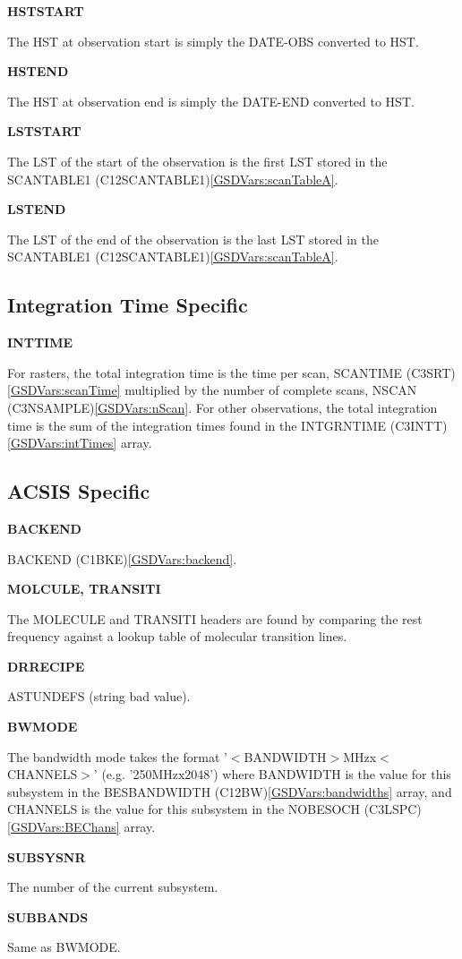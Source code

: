 \documentclass[twoside,11pt]{article}
\newcommand{\xlabel}[1]{}
\renewcommand{\_}{\texttt{\symbol{95}}}
\newcommand{\backend}{BACKEND (C1BKE)}
\newcommand{\nScan}{NSCAN (C3NSAMPLE)}
\newcommand{\scanTime}{SCAN\_TIME (C3SRT)}
\newcommand{\scanTableA}{SCAN\_TABLE1 (C12SCAN\_TABLE\_1)}
\newcommand{\BEChans}{NO\_BES\_O\_CH (C3LSPC)}
\newcommand{\bandwidths}{BES\_BANDWIDTH (C12BW)}
\newcommand{\intTimes}{INTGRN\_TIME (C3INTT)}
\renewcommand{\backend}{BACKEND (C1BKE)\ref{GSDVars:backend}}
\renewcommand{\nScan}{NSCAN (C3NSAMPLE)\ref{GSDVars:nScan}}
\renewcommand{\scanTime}{SCAN\_TIME (C3SRT)\ref{GSDVars:scanTime}}
\renewcommand{\scanTableA}{SCAN\_TABLE1 (C12SCAN\_TABLE\_1)\ref{GSDVars:scanTableA}}
\renewcommand{\BEChans}{NO\_BES\_O\_CH (C3LSPC)\ref{GSDVars:BEChans}}
\renewcommand{\bandwidths}{BES\_BANDWIDTH (C12BW)\ref{GSDVars:bandwidths}}
\renewcommand{\intTimes}{INTGRN\_TIME (C3INTT)\ref{GSDVars:intTimes}}
\begin{document}
{\bf HSTSTART}

The HST at observation start is simply the DATE-OBS converted to HST.

{\bf HSTEND}

The HST at observation end is simply the DATE-END converted to HST.

{\bf LSTSTART}

The LST of the start of the observation is the first LST stored in the \scanTableA.

{\bf LSTEND}

The LST of the end of the observation is the last LST stored in the \scanTableA.

\subsection{\xlabel{FITS_Integration_Time}Integration Time Specific}

{\bf INT\_TIME}

For rasters, the total integration time is the time per scan, \scanTime{} multiplied by the number of complete scans, \nScan.  For other observations, the total integration time is the sum of the integration times found in the \intTimes{} array.

\subsection{\xlabel{FITS_ACSIS}ACSIS Specific}

{\bf BACKEND}

\backend.

{\bf MOLCULE, TRANSITI}

The MOLECULE and TRANSITI headers are found by comparing the rest frequency against a lookup table of molecular transition lines.

{\bf DRRECIPE}

AST\_\_UNDEFS (string bad value).

{\bf BWMODE}

The bandwidth mode takes the format '$<$BANDWIDTH$>$MHzx$<$CHANNELS$>$' (e.g. '250MHzx2048') where BANDWIDTH is the value for this subsystem in the \bandwidths{} array, and CHANNELS is the value for this subsystem in the \BEChans{} array.

{\bf SUBSYSNR}

The number of the current subsystem.

{\bf SUBBANDS}

Same as BWMODE.
\end{document}
